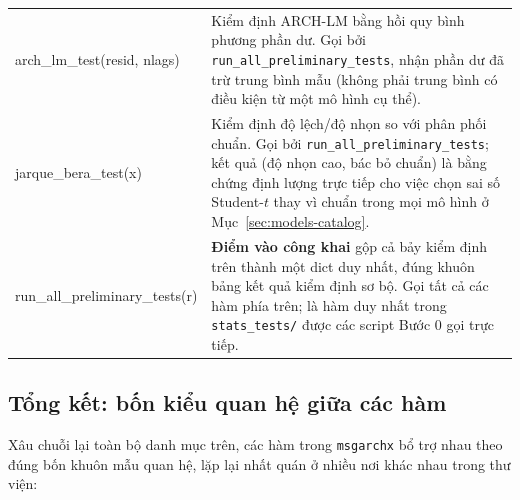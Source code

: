 \documentclass[11pt,a4paper]{article}
\newcommand{\code}[1]{\texttt{#1}}
\begin{document}
\begin{longtable}{@{}>{\ttfamily\scriptsize\raggedright\arraybackslash}p{5.0cm} >{\raggedright\arraybackslash}p{9.5cm}@{}}
arch\_lm\_test(resid, nlags) & Kiểm định ARCH-LM bằng hồi quy bình phương phần dư. Gọi bởi \code{run\_all\_preliminary\_tests}, nhận phần dư đã trừ trung bình mẫu (không phải trung bình có điều kiện từ một mô hình cụ thể). \\
jarque\_bera\_test(x) & Kiểm định độ lệch/độ nhọn so với phân phối chuẩn. Gọi bởi \code{run\_all\_preliminary\_tests}; kết quả (độ nhọn cao, bác bỏ chuẩn) là bằng chứng định lượng trực tiếp cho việc chọn sai số Student-$t$ thay vì chuẩn trong mọi mô hình ở Mục~\ref{sec:models-catalog}. \\
run\_all\_preliminary\_tests(r) & \textbf{Điểm vào công khai} gộp cả bảy kiểm định trên thành một dict duy nhất, đúng khuôn bảng kết quả kiểm định sơ bộ. Gọi tất cả các hàm phía trên; là hàm duy nhất trong \code{stats\_tests/} được các script Bước 0 gọi trực tiếp. \\
\end{longtable}

\subsection{Tổng kết: bốn kiểu quan hệ giữa các hàm}

Xâu chuỗi lại toàn bộ danh mục trên, các hàm trong \code{msgarchx} bổ trợ nhau theo
đúng bốn khuôn mẫu quan hệ, lặp lại nhất quán ở nhiều nơi khác nhau trong thư viện:
\end{document}
